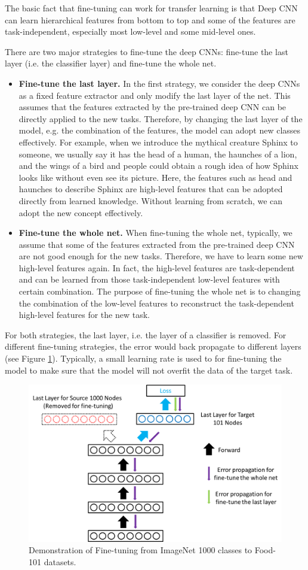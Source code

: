 The basic fact that fine-tuning can work for transfer learning is that Deep CNN can learn hierarchical features from bottom to top and some of the features are task-independent, especially most low-level and some mid-level ones.

There are two major strategies to fine-tune the deep CNNs: fine-tune the last layer (i.e. the classifier layer) and fine-tune the whole net.

\begin{itemize}
	\item \textbf{Fine-tune the last layer.} In the first strategy, we consider the deep CNNs as a fixed feature extractor and only modify the last layer of the net. This assumes that the features extracted by the pre-trained deep CNN can be directly applied to the new tasks. Therefore, by changing the last layer of the model, e.g. the combination of the features, the model can adopt new classes effectively. For example, when we introduce the mythical creature Sphinx to someone, we usually say it has the head of a human, the haunches of a lion, and the wings of a bird and people could obtain a rough idea of how Sphinx looks like without even see its picture. Here, the features such as head and haunches to describe Sphinx are high-level features that can be adopted directly from learned knowledge. Without learning from scratch, we can adopt the new concept effectively.
	\item \textbf{Fine-tune the whole net.} When fine-tuning the whole net, typically, we assume that some of the features extracted from the pre-trained deep CNN are not good enough for the new tasks. Therefore, we have to learn some new high-level features again. In fact, the high-level features are task-dependent and can be learned from those task-independent low-level features with certain combination. The purpose of fine-tuning the whole net is to changing the combination of the low-level features to reconstruct the task-dependent high-level features for the new task. 
\end{itemize}

For both strategies, the last layer, i.e. the layer of a classifier is removed. For different fine-tuning strategies, the error would back propagate to different layers (see Figure \ref{fig:ft-net}). Typically, a small learning rate is used to for fine-tuning the model to make sure that the model will not overfit the data of the target task.

\begin{figure}
	\centering
	\includegraphics[scale=.5]{cnn/fig/ft.png}
	\caption{Demonstration of Fine-tuning from ImageNet 1000 classes to Food-101 datasets.}
	\label{fig:ft-net}
\end{figure}